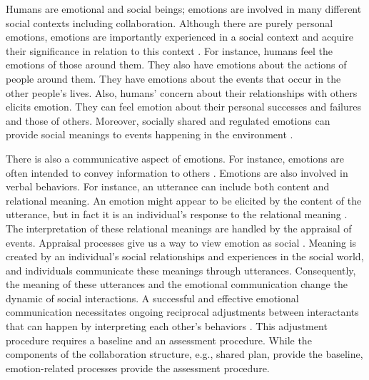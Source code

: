 Humans are emotional and social beings; emotions are involved in many different
social contexts including collaboration. Although there are purely personal
emotions, emotions are importantly experienced in a social context and acquire
their significance in relation to this context
\cite{parkinson:emotion-social-interaction}. For instance, humans feel the
emotions of those around them. They also have emotions about the actions of
people around them. They have emotions about the events that occur in the other
people's lives. Also, humans' concern about their relationships with others
elicits emotion. They can feel emotion about their personal successes and
failures and those of others. Moreover, socially shared and regulated emotions
can provide social meanings to events happening in the environment
\cite{wisecup:sociology-emotions}. 

There is also a communicative aspect of emotions. For instance, emotions are
often intended to convey information to others \cite{goffman:self-presentation}.
Emotions are also involved in verbal behaviors. For instance, an utterance can
include both content and relational meaning. An emotion might appear to be
elicited by the content of the utterance, but in fact it is an individual's
response to the relational meaning \cite{planalp:communicating-emotion}. The
interpretation of these relational meanings are handled by the appraisal of
events. Appraisal processes give us a way to view emotion as social
\cite{hooft:sharing-emotions}. Meaning is created by an individual's social
relationships and experiences in the social world, and individuals communicate
these meanings through utterances. Consequently, the meaning of these utterances
and the emotional communication change the dynamic of social interactions. A
successful and effective emotional communication necessitates ongoing reciprocal
adjustments between interactants that can happen by interpreting each other's
behaviors \cite{parkinson:emotion-social-interaction}. This adjustment procedure
requires a baseline and an assessment procedure. While the components of the
collaboration structure, e.g., shared plan, provide the baseline,
emotion-related processes provide the assessment procedure.

